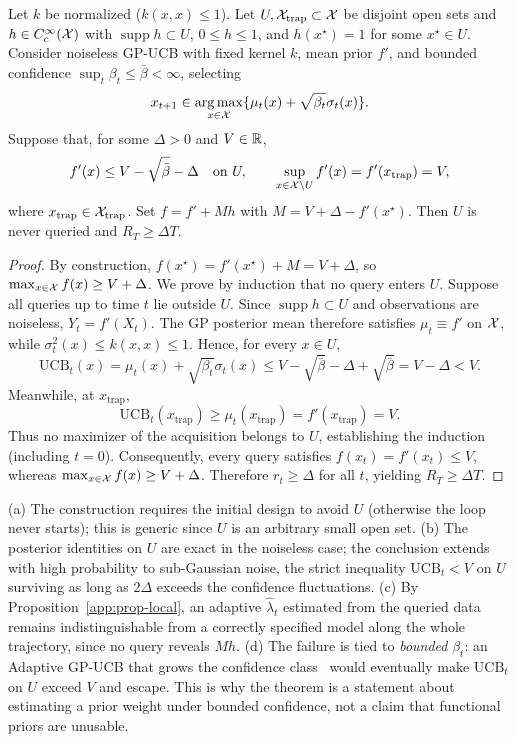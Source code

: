 \begin{theorem}
\label{app:thm-priorfail}
Let $k$ be normalized ($k(x,x)\le1$). Let $U,\mathcal{X}_{\mathrm{trap}}\subset\mathcal{X}$
be disjoint open sets and $h\in C_c^\infty(\mathcal{X})$ with
$\operatorname{supp}h\subset U$, $0\le h\le1$, and $h(x^\star)=1$
for some $x^\star\in U$. Consider noiseless GP-UCB with fixed kernel $k$,
mean prior $f'$, and bounded confidence
$\sup_t\beta_t\le\bar\beta<\infty$, selecting
\[
x_{t+1}\in\operatorname*{arg\,max}_{x\in\mathcal{X}}
\{\mu_t(x)+\sqrt{\beta_t}\sigma_t(x)\}.
\]
Suppose that, for some $\Delta>0$ and $V\in\mathbb{R}$,
\[
f'(x)\le V-\sqrt{\bar\beta}-\Delta
\quad\text{on }U,
\qquad
\sup_{x\in\mathcal{X}\setminus U}f'(x)
=f'(x_{\mathrm{trap}})=V,
\]
where $x_{\mathrm{trap}}\in\mathcal{X}_{\mathrm{trap}}$. Set $f=f'+Mh$ with
$M=V+\Delta-f'(x^\star)$. Then $U$ is never queried and
$R_T\ge\Delta T$.
\end{theorem}

\begin{proof}
By construction, $f(x^\star)=f'(x^\star)+M=V+\Delta$, so
$\max_{x\in\mathcal{X}}f(x)\ge V+\Delta$.
We prove by induction that no query enters $U$. Suppose all queries
up to time $t$ lie outside $U$. Since $\operatorname{supp}h\subset U$
and observations are noiseless, $Y_t=f'(X_t)$. The GP posterior
mean therefore satisfies $\mu_t\equiv f'$ on $\mathcal{X}$, while
$\sigma_t^2(x)\le k(x,x)\le1$. Hence, for every $x\in U$,
\[
\mathrm{UCB}_t(x)
=\mu_t(x)+\sqrt{\beta_t}\sigma_t(x)
\le V-\sqrt{\bar\beta}-\Delta+\sqrt{\bar\beta}
=V-\Delta<V.
\]
Meanwhile, at $x_{\mathrm{trap}}$,
\[
\mathrm{UCB}_t(x_{\mathrm{trap}})
\ge\mu_t(x_{\mathrm{trap}})
=f'(x_{\mathrm{trap}})=V.
\]
Thus no maximizer of the acquisition belongs to $U$, establishing
the induction (including $t=0$). Consequently, every query
satisfies $f(x_t)=f'(x_t)\le V$, whereas
$\max_{x\in\mathcal{X}}f(x)\ge V+\Delta$. Therefore
$r_t\ge\Delta$ for all $t$, yielding $R_T\ge\Delta T$.
\end{proof}

\begin{remark}
(a) The construction requires the initial design to avoid $U$ (otherwise the loop
never starts); this is generic since $U$ is an arbitrary small open set.
(b) The posterior identities on $U$ are exact in the noiseless case; the
conclusion extends with high probability to sub-Gaussian noise, the strict
inequality $\mathrm{UCB}_t<V$ on $U$ surviving as long as $2\Delta$ exceeds the
confidence fluctuations. (c) By Proposition~\ref{app:prop-local}, an adaptive
$\widehat\lambda_t$ estimated from the queried data remains indistinguishable from
a correctly specified model along the whole trajectory, since no query reveals
$Mh$. (d) The failure is tied to \emph{bounded} $\beta_t$: an Adaptive GP-UCB
that grows the confidence class~\cite{berkenkamp2019} would eventually make
$\mathrm{UCB}_t$ on $U$ exceed $V$ and escape. This is why the theorem is a
statement about estimating a prior weight under bounded confidence, not a claim
that functional priors are unusable.
\end{remark}
